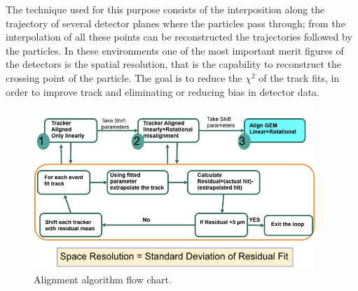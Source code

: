 The technique used for this purpose consists of the interposition along the trajectory of several detector planes where the particles pass through; from the interpolation of all these points can be reconstructed the trajectories followed by the particles.
In these environments one of the most important merit figures of the detectors is the spatial resolution, that is the capability to reconstruct the crossing point of the particle.
The goal is to reduce the $\chi^{2}$ of the track fits, in order to improve track and eliminating or reducing bias in detector data.

\begin{figure}[htbp]
    \centering
    \includegraphics[width=0.95\textwidth]{figures/GEM/GEM_Alignment_FlowChart.jpeg}
    \caption{Alignment algorithm flow chart.}
    \label{fig:alignment}
\end{figure}

